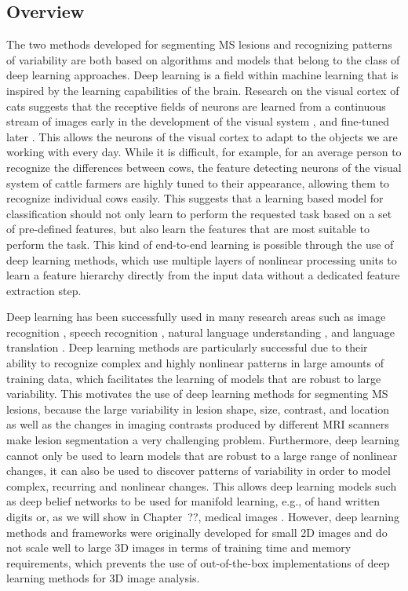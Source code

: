 \subsection{Overview}

The two methods developed for segmenting MS lesions and recognizing patterns of
variability are both based on algorithms and models that belong to the class of
deep learning approaches. Deep learning is a field within machine learning that
is inspired by the learning capabilities of the brain. Research on the visual
cortex of cats suggests that the receptive fields of neurons are learned from a
continuous stream of images early in the development of the visual system
\citep{wiesel1963}, and fine-tuned later \citep{karni1991}. This allows the
neurons of the visual cortex to adapt to the objects we are working with every
day. While it is difficult, for example, for an average person to recognize the
differences between cows, the feature detecting neurons of the visual system of
cattle farmers are highly tuned to their appearance, allowing them to recognize
individual cows easily. This suggests that a learning based model for
classification should not only learn to perform the requested task based on a
set of pre-defined features, but also learn the features that are most
suitable to perform the task. This kind of end-to-end learning is possible
through the use of deep learning methods, which use multiple layers of nonlinear
processing units to learn a feature hierarchy directly from the input data
without a dedicated feature extraction step.

Deep learning has been successfully used in many research areas such as image
recognition \citep{krizhevsky2012}, speech recognition \citep{hinton2012deep},
natural language understanding \citep{collobert2011natural}, and language
translation \citep{sutskever2014sequence}. Deep learning methods are
particularly successful due to their ability to recognize complex and highly
nonlinear patterns in large amounts of training data, which facilitates the
learning of models that are robust to large variability. This motivates the use
of deep learning methods for segmenting MS lesions, because the large
variability in lesion shape, size, contrast, and location as well as the changes
in imaging contrasts produced by different MRI scanners make lesion segmentation
a very challenging problem. Furthermore, deep learning cannot only be used
to learn models that are robust to a large range of nonlinear changes, it can
also be used to discover patterns of variability in order to model complex,
recurring and nonlinear changes. This allows deep learning models such as deep
belief networks to be used for manifold learning, e.g., of hand written digits
\citep{hinton2006b} or, as we will show in Chapter~??, medical images
\citep{brosch2013}. However, deep learning methods and frameworks
were originally developed for small 2D images and do not scale well to large 3D
images in terms of training time and memory requirements, which prevents the use
of out-of-the-box implementations of deep learning methods for 3D image
analysis.

